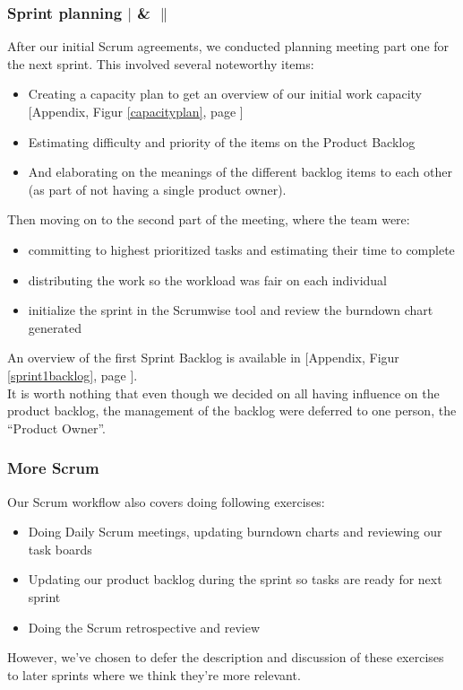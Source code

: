 \subsubsection{Sprint planning $|$ \& $\|$}
After our initial Scrum agreements, we conducted planning meeting part one for the next sprint. This involved several noteworthy items:
\begin{itemize}
\item Creating a capacity plan to get an overview of our initial work capacity [Appendix, Figur \ref{capacityplan}, page \pageref{capacityplan}]
\item Estimating difficulty and priority of the items on the Product Backlog
\item And elaborating on the meanings of the different backlog items to each other (as part of not having a single product owner).
\end{itemize}
Then moving on to the second part of the meeting, where the team were:
\begin{itemize}
\item committing to highest prioritized tasks and estimating their time to complete
\item distributing the work so the workload was fair on each individual
\item initialize the sprint in the Scrumwise tool and review the burndown chart generated
\end{itemize}
An overview of the first Sprint Backlog is available in [Appendix, Figur \ref{sprint1backlog}, page \pageref{sprint1backlog}].\\
It is worth nothing that even though we decided on all having influence on the product backlog, the management of the backlog were deferred to one person, the “Product Owner”.\\
\subsubsection{More Scrum}
Our Scrum workflow also covers doing following exercises:\\
\begin{itemize}
\item Doing Daily Scrum meetings, updating burndown charts and reviewing our task boards
\item Updating our product backlog during the sprint so tasks are ready for next sprint
\item Doing the Scrum retrospective and review
\end{itemize}
However, we’ve chosen to defer the description and discussion of these exercises to later sprints where we think they’re more relevant.




\newpage